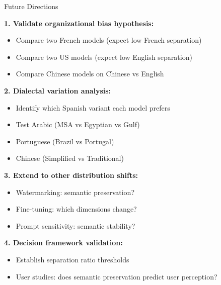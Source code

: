 \documentclass[aspectratio=169,11pt]{beamer}
\begin{document}
\begin{frame}{Future Directions}

\textbf{1. Validate organizational bias hypothesis:}
\begin{itemize}
  \item Compare two French models (expect low French separation)
  \item Compare two US models (expect low English separation)
  \item Compare Chinese models on Chinese vs English
\end{itemize}

\vspace{0.5em}

\textbf{2. Dialectal variation analysis:}
\begin{itemize}
  \item Identify which Spanish variant each model prefers
  \item Test Arabic (MSA vs Egyptian vs Gulf)
  \item Portuguese (Brazil vs Portugal)
  \item Chinese (Simplified vs Traditional)
\end{itemize}

\vspace{0.5em}

\textbf{3. Extend to other distribution shifts:}
\begin{itemize}
  \item Watermarking: semantic preservation?
  \item Fine-tuning: which dimensions change?
  \item Prompt sensitivity: semantic stability?
\end{itemize}

\vspace{0.5em}

\textbf{4. Decision framework validation:}
\begin{itemize}
  \item Establish separation ratio thresholds
  \item User studies: does semantic preservation predict user perception?
\end{itemize}

\end{frame}
\end{document}

